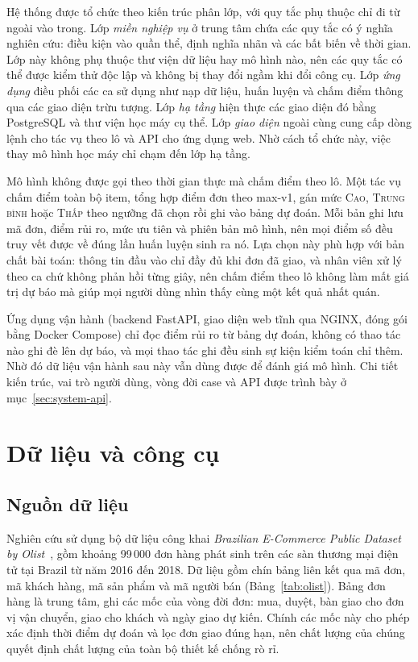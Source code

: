 Hệ thống được tổ chức theo kiến trúc phân lớp, với quy tắc phụ thuộc chỉ đi từ ngoài vào trong. Lớp \emph{miền nghiệp vụ} ở trung tâm chứa các quy tắc có ý nghĩa nghiên cứu: điều kiện vào quần thể, định nghĩa nhãn và các bất biến về thời gian. Lớp này không phụ thuộc thư viện dữ liệu hay mô hình nào, nên các quy tắc có thể được kiểm thử độc lập và không bị thay đổi ngầm khi đổi công cụ. Lớp \emph{ứng dụng} điều phối các ca sử dụng như nạp dữ liệu, huấn luyện và chấm điểm thông qua các giao diện trừu tượng. Lớp \emph{hạ tầng} hiện thực các giao diện đó bằng PostgreSQL và thư viện học máy cụ thể. Lớp \emph{giao diện} ngoài cùng cung cấp dòng lệnh cho tác vụ theo lô và API cho ứng dụng web. Nhờ cách tổ chức này, việc thay mô hình học máy chỉ chạm đến lớp hạ tầng.

Mô hình không được gọi theo thời gian thực mà chấm điểm theo lô. Một tác vụ chấm điểm toàn bộ item, tổng hợp điểm đơn theo max-v1, gán mức \textsc{Cao}, \textsc{Trung bình} hoặc \textsc{Thấp} theo ngưỡng đã chọn rồi ghi vào bảng dự đoán. Mỗi bản ghi lưu mã đơn, điểm rủi ro, mức ưu tiên và phiên bản mô hình, nên mọi điểm số đều truy vết được về đúng lần huấn luyện sinh ra nó. Lựa chọn này phù hợp với bản chất bài toán: thông tin đầu vào chỉ đầy đủ khi đơn đã giao, và nhân viên xử lý theo ca chứ không phản hồi từng giây, nên chấm điểm theo lô không làm mất giá trị dự báo mà giúp mọi người dùng nhìn thấy cùng một kết quả nhất quán.

Ứng dụng vận hành (backend FastAPI, giao diện web tĩnh qua NGINX, đóng gói bằng Docker Compose) chỉ đọc điểm rủi ro từ bảng dự đoán, không có thao tác nào ghi đè lên dự báo, và mọi thao tác ghi đều sinh sự kiện kiểm toán chỉ thêm. Nhờ đó dữ liệu vận hành sau này vẫn dùng được để đánh giá mô hình. Chi tiết kiến trúc, vai trò người dùng, vòng đời case và API được trình bày ở mục~\ref{sec:system-api}.

\section{Dữ liệu và công cụ}\label{sec:data}

\subsection{Nguồn dữ liệu}

Nghiên cứu sử dụng bộ dữ liệu công khai \emph{Brazilian E-Commerce Public Dataset by Olist}~\cite{olist2018}, gồm khoảng 99\,000 đơn hàng phát sinh trên các sàn thương mại điện tử tại Brazil từ năm 2016 đến 2018. Dữ liệu gồm chín bảng liên kết qua mã đơn, mã khách hàng, mã sản phẩm và mã người bán (Bảng~\ref{tab:olist}). Bảng đơn hàng là trung tâm, ghi các mốc của vòng đời đơn: mua, duyệt, bàn giao cho đơn vị vận chuyển, giao cho khách và ngày giao dự kiến. Chính các mốc này cho phép xác định thời điểm dự đoán và lọc đơn giao đúng hạn, nên chất lượng của chúng quyết định chất lượng của toàn bộ thiết kế chống rò rỉ.


